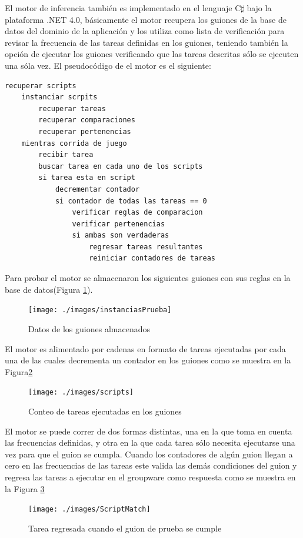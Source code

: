 El motor de inferencia tambi\'en es implementado en el lenguaje C$\sharp$ bajo la plataforma .NET 4.0, b\'asicamente el motor recupera los guiones de la base de datos del dominio de la aplicaci\'on y  los utiliza como lista de verificaci\'on para revisar la frecuencia de las tareas definidas en los guiones, teniendo tambi\'en la opci\'on de ejecutar los guiones verificando que las tareas descritas s\'olo se ejecuten una s\'ola vez. El pseudoc\'odigo de el motor es el siguiente:

\begin{verbatim}
recuperar scripts
    instanciar scrpits
        recuperar tareas
        recuperar comparaciones
        recuperar pertenencias
    mientras corrida de juego
        recibir tarea
        buscar tarea en cada uno de los scripts
        si tarea esta en script 
            decrementar contador
            si contador de todas las tareas == 0
                verificar reglas de comparacion
                verificar pertenencias
                si ambas son verdaderas
                    regresar tareas resultantes
                    reiniciar contadores de tareas
\end{verbatim}

Para probar el motor se almacenaron los siguientes guiones con sus reglas en la base de datos(Figura \ref{fig:instanciasPrueba}).

\begin{figure}
\centering
\texttt{[image: ./images/instanciasPrueba]}
\caption{Datos de los guiones almacenados}
\label{fig:instanciasPrueba}
\end{figure}

El motor es alimentado por cadenas en formato de tareas ejecutadas por cada una de las cuales decrementa un contador en los guiones como se muestra en la Figura\ref{fig:scripts}

\begin{figure}
\centering
\texttt{[image: ./images/scripts]}
\caption{Conteo de tareas ejecutadas en los guiones}
\label{fig:scripts}
\end{figure}

El motor se puede correr de dos formas distintas, una en la que toma en cuenta las frecuencias definidas, y otra en la que cada tarea s\'olo necesita ejecutarse una vez para que el guion se cumpla.
Cuando los contadores de alg\'un guion llegan a cero en las frecuencias de las tareas este valida las dem\'as condiciones del guion y regresa las tareas a ejecutar en el groupware como respuesta como se muestra en la Figura \ref{fig:ScriptMatch}

\begin{figure}[h]
\centering
\texttt{[image: ./images/ScriptMatch]}
\caption{Tarea regresada cuando el guion de prueba se cumple}
\label{fig:ScriptMatch}
\end{figure}
